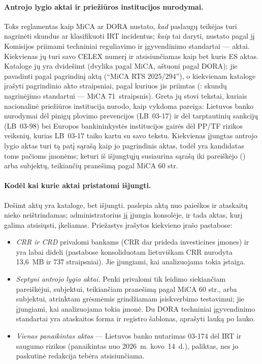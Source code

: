 \paragraph{Antrojo lygio aktai ir priežiūros institucijos nurodymai.} Toks reglamentas kaip
MiCA ar DORA nustato, \emph{kad} paslaugų teikėjas turi nagrinėti skundus ar klasifikuoti IRT
incidentus; \emph{kaip} tai daryti, nustato pagal jį Komisijos priimami techniniai reguliavimo
ir įgyvendinimo standartai ---  aktai. Kiekvienas jų turi savo CELEX numerį
ir atsisiunčiamas kaip bet kuris ES aktas. Kataloge jų yra dvidešimt (dvylika pagal MiCA,
aštuoni pagal DORA); jie pavadinti pagal pagrindinį aktą (\enquote{MiCA RTS 2025/294}), o
kiekvienam kataloge įrašyti pagrindinio akto straipsniai, pagal kuriuos jis priimtas
(: skundų nagrinėjimo standartui --- MiCA 71~straipsnis). Greta jų
stovi tekstai, kuriais nacionalinė priežiūros institucija nurodo, kaip vykdoma pareiga: Lietuvos
banko nurodymai dėl pinigų plovimo prevencijos (LB~03-17) ir dėl tarptautinių sankcijų
(LB~03-98) bei Europos bankininkystės institucijos gairės dėl PP/TF rizikos veiksnių, kurias
LB~03-17 taiko kartu su savo tekstu. Kiekvienas įjungtas antrojo lygio aktas turi tą patį
 sąrašą kaip jo pagrindinis aktas, todėl yra kandidatas toms pačioms įmonėms;
keturi iš išjungtųjų susiaurina sąrašą iki pareiškėjo () arba subjektų, teikiančių
pranešimą pagal MiCA 60 str.

\paragraph{Kodėl kai kurie aktai pristatomi išjungti.} Dešimt aktų yra kataloge, bet išjungti.
 paslepia aktą nuo paieškos ir ataskaitų nieko neištrindamas;
administratorius jį įjungia konsolėje, ir tada aktas, kurį galima atsisiųsti, įkeliamas. Priežastys
įrašytos kiekvieno įrašo pastabose:
\begin{itemize}
  \item \emph{CRR ir CRD} privalomi bankams (CRR  dar prideda investicines
    įmones) ir yra labai dideli (pastabose konsoliduotam lietuviškam CRR nurodyta 13,6~MB ir
    737 straipsniai). Jie įjungiami, kai analizuojama tokia įstaiga.
  \item \emph{Septyni antrojo lygio aktai.} Penki privalomi tik leidimo siekiančiam
    pareiškėjui, subjektui, teikiančiam pranešimą pagal MiCA 60 str., arba subjektui,
    atrinktam grėsmėmis grindžiamam įsiskverbimo testavimui; jie įjungiami, kai analizuojama
    tokia įmonė. Du DORA techniniai įgyvendinimo standartai yra ataskaitos forma ir registro
    šablonas, aprašyti lauką po lauko.
  \item \emph{Vienas panaikintas aktas} --- Lietuvos banko nutarimas 03-174 dėl IRT ir
    saugumo rizikos (panaikintas nuo 2026~m. kovo~14~d.), paliktas, nes jo paskutinė
    redakcija tebėra atsisiunčiama.
\end{itemize}

